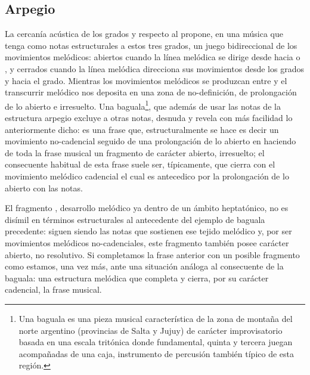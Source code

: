 \documentclass[a4paper,12pt]{article}
\begin{document}
\begin{multicols}{2}
  \subsection{Arpegio}\label{subsec:arpegio}
  La cercanía acústica de los grados  y  respecto al  propone, en una música que tenga como notas estructurales a estos tres grados, un juego bidireccional de los movimientos melódicos: abiertos cuando la línea melódica se dirige desde  hacia  o , y cerrados cuando la línea melódica direcciona sus movimientos desde los grados  y  hacia el  grado. Mientras los movimientos melódicos se produzcan entre  y  el transcurrir melódico nos deposita en una zona de no-definición, de prolongación de lo abierto e irresuelto. Una baguala\footnote{Una baguala es una pieza musical característica de la zona de montaña del norte argentino (provincias de Salta y Jujuy) de carácter improvisatorio basada en una escala tritónica donde fundamental, quinta y tercera juegan acompañadas de una caja, instrumento de percusión también típico de esta región.}, que además de usar las notas de la estructura arpegio excluye a otras notas, desnuda y revela con más facilidad lo anteriormente dicho:  es una frase que, estructuralmente se hace  es decir un movimiento no-cadencial  seguido de una prolongación de lo abierto en  haciendo de toda la frase musical un fragmento de carácter abierto, irresuelto; el consecuente habitual de esta frase suele ser, típicamente,  que cierra con el movimiento melódico cadencial  el cual es antecedico por la prolongación de lo abierto con las notas\hbox{.}

  El fragmento , desarrollo melódico ya dentro de un ámbito heptatónico, no es disímil en términos estructurales al antecedente del ejemplo de baguala precedente:  siguen siendo las notas que sostienen ese tejido melódico y, por ser movimientos melódicos no-cadenciales, este fragmento también posee carácter abierto, no resolutivo. Si completamos la frase anterior con un posible fragmento como  estamos, una vez más, ante una situación análoga al consecuente de la baguala: una estructura melódica  que completa y cierra, por su carácter cadencial, la frase musical.


\end{multicols}
\end{document}
